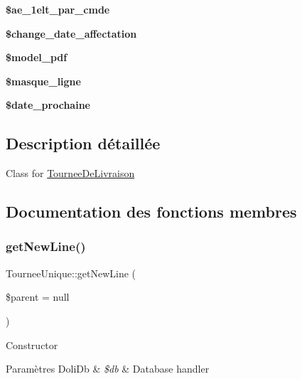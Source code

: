 \begin{DoxyCompactItemize}
\mbox{\label{classTourneeUnique_acdb3e77f08cec592d0533c6b7a673348}} 
{\bfseries \$ae\+\_\+1elt\+\_\+par\+\_\+cmde}
\item 
\mbox{\label{classTourneeUnique_a8c9fdc12cf0df201136c14839a7280cb}} 
{\bfseries \$change\+\_\+date\+\_\+affectation}
\item 
\mbox{\label{classTourneeUnique_acc7b390c3cf812d4f403a69612205eb1}} 
{\bfseries \$model\+\_\+pdf}
\item 
\mbox{\label{classTourneeUnique_a49697e2bfd80b039ad810b32caa2c683}} 
{\bfseries \$masque\+\_\+ligne}
\item 
\mbox{\label{classTourneeUnique_aeb5fcca9a1fbb803fbeab1afdb84d72b}} 
{\bfseries \$date\+\_\+prochaine}
\end{DoxyCompactItemize}


\subsection{Description détaillée}
Class for \hyperlink{classTourneeDeLivraison}{Tournee\+De\+Livraison} 

\subsection{Documentation des fonctions membres}
\mbox{\label{classTourneeUnique_ad6b2fd79cbb1d2291e2574c26934c0b6}} 
\subsubsection{\texorpdfstring{get\+New\+Line()}{getNewLine()}}
{\footnotesize\ttfamily Tournee\+Unique\+::get\+New\+Line (\begin{DoxyParamCaption}\item[{}]{\$parent = {\ttfamily null} }\end{DoxyParamCaption})}

Constructor


\begin{DoxyParams}[1]{Paramètres}
Doli\+Db & {\em \$db} & Database handler \\
\hline
\end{DoxyParams}


